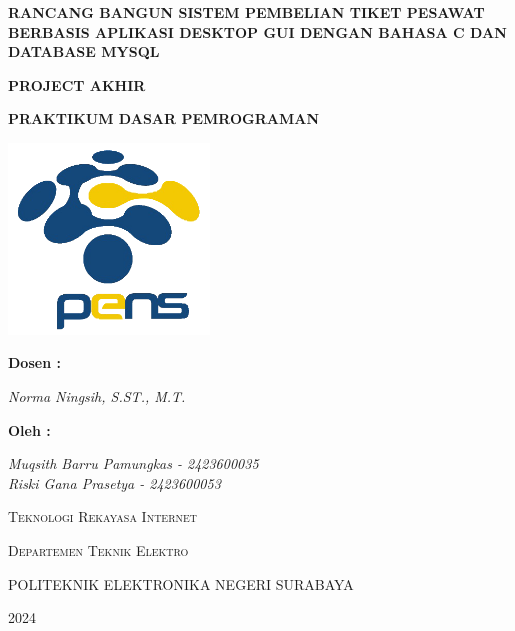 \documentclass[a4paper,12pt]{report}
\begin{document}
\begin{titlepage}
    \centering
    {\large\bfseries RANCANG BANGUN SISTEM PEMBELIAN TIKET PESAWAT BERBASIS APLIKASI DESKTOP GUI DENGAN BAHASA C DAN DATABASE MYSQL\par}
    \vspace{0.3cm}
    {\large\bfseries PROJECT AKHIR\par}
    {\large\bfseries PRAKTIKUM DASAR PEMROGRAMAN\par}
    \vspace{2cm}
    \vspace*{0.5cm}
    \includegraphics[width=0.4\textwidth]{Logo_PENS.png}\par\vspace{1cm}
    \vspace{1cm}
    {\large\bfseries Dosen :\par}
    {\Large\itshape Norma Ningsih, S.ST., M.T.\par}
    \vspace{1cm}
    {\large\bfseries Oleh :\par}
    {\Large\itshape Muqsith Barru Pamungkas - 2423600035\\Riski Gana Prasetya - 2423600053\par}
    \vspace{1cm}
    {\scshape\LARGE Teknologi Rekayasa Internet \par}
    {\scshape\LARGE Departemen Teknik Elektro \par}
    \vspace{0.5cm}
    {\scshape\Large POLITEKNIK ELEKTRONIKA NEGERI SURABAYA\par}
    {\scshape\Large 2024\par}
    \vfill
\end{titlepage}

\end{document}
